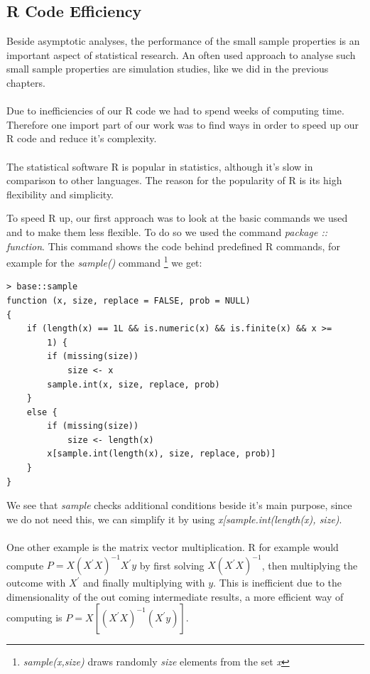 \documentclass[Research_Module_ES.tex]{subfiles}
\begin{document}
\subsection{R Code Efficiency}
Beside asymptotic analyses, the performance of the small sample properties is an important aspect of statistical research. An often used approach to analyse such small sample properties are simulation studies, like we did in the previous chapters.\\
\\
Due to inefficiencies of our R code we had to spend weeks of computing time. Therefore one import part of our work was to find ways in order to speed up our R code and reduce it's complexity.\\
\\
The statistical software R is popular in statistics, although it's slow in comparison to other languages. The reason for the popularity of R is its high flexibility and simplicity.

To speed R up, our first approach was to look at the basic commands we used and to make them less flexible. To do so we used the command {\itshape package :: function}. This command shows the code behind predefined R commands, for example for the {\itshape sample()} command \footnote{{\itshape sample(x,size)} draws randomly {\itshape size} elements from the set {\itshape x} } we get:
\begin{lstlisting}
> base::sample
function (x, size, replace = FALSE, prob = NULL) 
{
	if (length(x) == 1L && is.numeric(x) && is.finite(x) && x >= 
		1) {
		if (missing(size)) 
			size <- x
		sample.int(x, size, replace, prob)
	}
	else {
		if (missing(size)) 
			size <- length(x)
		x[sample.int(length(x), size, replace, prob)]	
	}
}
\end{lstlisting}
We see that {\itshape sample} checks additional conditions beside it's main purpose, since we do not need this, we can simplify it by using {\itshape x[sample.int(length(x), size)}.\\
\\
One other example is the matrix vector multiplication. R for example would compute $P=X(X^\prime X)^{-1}X^\prime y$ by first solving $X(X^\prime X)^{-1}$, then multiplying the outcome with $X^\prime$ and finally multiplying with $y$. This is inefficient due to the dimensionality of the out coming intermediate results, a more efficient way of computing is $P=X[ (X^\prime X)^{-1}(X^\prime y)]$.
\end{document}
